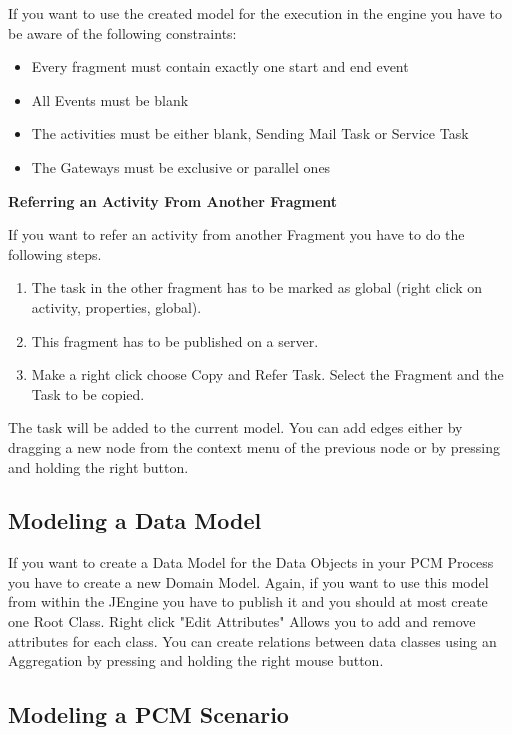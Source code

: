 If you want to use the created model for the execution in the engine you have to be aware of the following constraints:

\begin{itemize}
\item Every fragment must contain exactly one start and end event
\item All Events must be blank
\item The activities must be either blank, Sending Mail Task or Service Task
\item The Gateways must be exclusive or parallel ones
\end{itemize}

\noindent
\textbf{Referring an Activity From Another Fragment}

\noindent
If you want to refer an activity from another Fragment you have to do the following steps.
\begin{enumerate}
\item The task in the other fragment has to be marked as global (right click on activity, properties, global).
\item This fragment has to be published on a server.
\item Make a right click choose Copy and Refer Task. Select the Fragment and the Task to be copied.
\end{enumerate} 
The task will be added to the current model.
\noindent
You can add edges either by dragging a new node from the context menu of the previous node or by pressing and holding the right button.

\subsection{Modeling a Data Model}

If you want to create a Data Model for the Data Objects in your PCM Process you have to create a new Domain Model. Again, if you want to use this model from within the JEngine you have to publish it and you should at most create one Root Class.
Right click "Edit Attributes" Allows you to add and remove attributes for each class.
You can create relations between data classes using an Aggregation by pressing and holding the right mouse button.

\subsection{Modeling a PCM Scenario}

